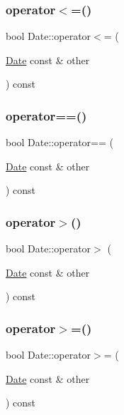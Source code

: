 \mbox{\label{classDate_a01c66a5f355ed676a1ee8effb78af222}} 
\subsubsection{\texorpdfstring{operator$<$=()}{operator<=()}}
{\footnotesize\ttfamily bool Date\+::operator$<$= (\begin{DoxyParamCaption}\item[{\hyperlink{classDate}{Date} const \&}]{other }\end{DoxyParamCaption}) const}

\mbox{\label{classDate_a0b4650e6e69f6ab4816ee480b0ae2737}} 
\subsubsection{\texorpdfstring{operator==()}{operator==()}}
{\footnotesize\ttfamily bool Date\+::operator== (\begin{DoxyParamCaption}\item[{\hyperlink{classDate}{Date} const \&}]{other }\end{DoxyParamCaption}) const}

\mbox{\label{classDate_a52d36d1aa6868b5afa178bd495714e44}} 
\subsubsection{\texorpdfstring{operator$>$()}{operator>()}}
{\footnotesize\ttfamily bool Date\+::operator$>$ (\begin{DoxyParamCaption}\item[{\hyperlink{classDate}{Date} const \&}]{other }\end{DoxyParamCaption}) const}

\mbox{\label{classDate_ac1bca91434bf336beb5372ee4a2ca46f}} 
\subsubsection{\texorpdfstring{operator$>$=()}{operator>=()}}
{\footnotesize\ttfamily bool Date\+::operator$>$= (\begin{DoxyParamCaption}\item[{\hyperlink{classDate}{Date} const \&}]{other }\end{DoxyParamCaption}) const}

